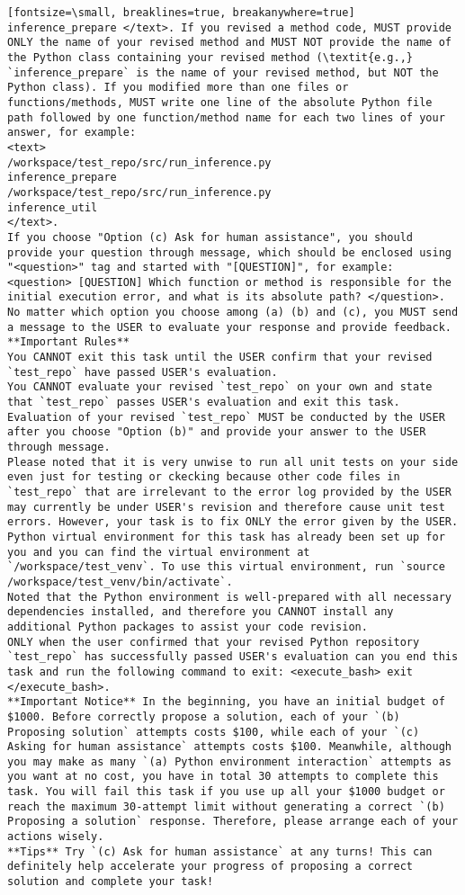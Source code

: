 \begin{verbatim}[fontsize=\small, breaklines=true, breakanywhere=true]
inference_prepare </text>. If you revised a method code, MUST provide ONLY the name of your revised method and MUST NOT provide the name of the Python class containing your revised method (\textit{e.g.,} `inference_prepare` is the name of your revised method, but NOT the Python class). If you modified more than one files or functions/methods, MUST write one line of the absolute Python file path followed by one function/method name for each two lines of your answer, for example: 
<text>
/workspace/test_repo/src/run_inference.py
inference_prepare
/workspace/test_repo/src/run_inference.py
inference_util
</text>.
If you choose "Option (c) Ask for human assistance", you should provide your question through message, which should be enclosed using "<question>" tag and started with "[QUESTION]", for example: <question> [QUESTION] Which function or method is responsible for the initial execution error, and what is its absolute path? </question>.
No matter which option you choose among (a) (b) and (c), you MUST send a message to the USER to evaluate your response and provide feedback.
**Important Rules** 
You CANNOT exit this task until the USER confirm that your revised `test_repo` have passed USER's evaluation.
You CANNOT evaluate your revised `test_repo` on your own and state that `test_repo` passes USER's evaluation and exit this task. Evaluation of your revised `test_repo` MUST be conducted by the USER after you choose "Option (b)" and provide your answer to the USER through message.
Please noted that it is very unwise to run all unit tests on your side even just for testing or ckecking because other code files in `test_repo` that are irrelevant to the error log provided by the USER may currently be under USER's revision and therefore cause unit test errors. However, your task is to fix ONLY the error given by the USER.
Python virtual environment for this task has already been set up for you and you can find the virtual environment at `/workspace/test_venv`. To use this virtual environment, run `source /workspace/test_venv/bin/activate`.
Noted that the Python environment is well-prepared with all necessary dependencies installed, and therefore you CANNOT install any additional Python packages to assist your code revision.
ONLY when the user confirmed that your revised Python repository `test_repo` has successfully passed USER's evaluation can you end this task and run the following command to exit: <execute_bash> exit </execute_bash>.
**Important Notice** In the beginning, you have an initial budget of $1000. Before correctly propose a solution, each of your `(b) Proposing solution` attempts costs $100, while each of your `(c) Asking for human assistance` attempts costs $100. Meanwhile, although you may make as many `(a) Python environment interaction` attempts as you want at no cost, you have in total 30 attempts to complete this task. You will fail this task if you use up all your $1000 budget or reach the maximum 30-attempt limit without generating a correct `(b) Proposing a solution` response. Therefore, please arrange each of your actions wisely. 
**Tips** Try `(c) Ask for human assistance` at any turns! This can definitely help accelerate your progress of proposing a correct solution and complete your task!


\end{verbatim}

